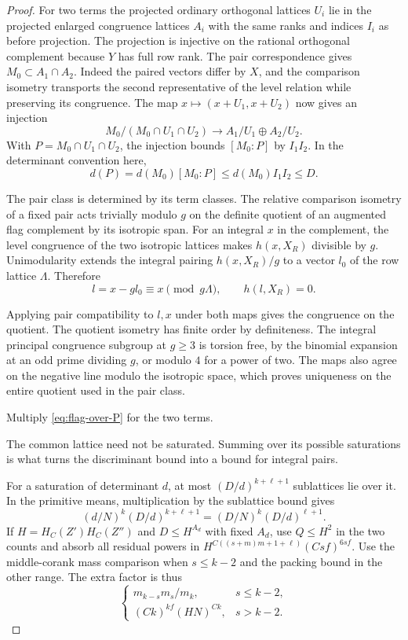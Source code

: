 \begin{proof}

For two terms the projected ordinary orthogonal lattices
\(U_i\) lie in the projected enlarged congruence lattices
\(A_i\) with the same ranks and indices \(I_i\) as before
projection. The projection is injective on the rational
orthogonal complement because \(Y\) has full row rank.
The pair correspondence gives \(M_0\subset A_1\cap A_2\).
Indeed the paired vectors differ by \(X\), and the
comparison isometry transports the second representative
of the level relation while preserving its congruence.
The map \(x\mapsto(x+U_1,x+U_2)\) now gives an injection
\[
 M_0/(M_0\cap U_1\cap U_2)\longrightarrow A_1/U_1\oplus A_2/U_2 .
\]
With \(P=M_0\cap U_1\cap U_2\), the injection bounds
\([M_0:P]\) by \(I_1I_2\). In the determinant convention here,
\[
       d(P)=d(M_0)[M_0:P]\le d(M_0)I_1I_2\le D.
\]


The pair class is determined by its term classes.
The relative comparison isometry of a fixed pair
acts trivially modulo \(g\) on the definite quotient
of an augmented flag complement by its isotropic span.
For an integral \(x\) in the complement,
the level congruence of the two isotropic lattices
makes \(h(x,X_R)\) divisible by \(g\). Unimodularity
extends the integral pairing \(h(x,X_R)/g\) to a vector \(l_0\)
of the row lattice \(\Lambda\). Therefore
\[
       l=x-g l_0\equiv x\pmod{g\Lambda},\qquad h(l,X_R)=0 .
\]

Applying
pair compatibility to \(l,x\) under both maps gives
the congruence on the quotient. The quotient isometry
has finite order by definiteness. The integral
principal congruence subgroup at \(g\geq3\) is
torsion free, by the binomial expansion at an odd
prime dividing \(g\), or modulo \(4\) for a power of
two. The maps also agree on the negative line modulo
the isotropic space, which proves uniqueness on the
entire quotient used in the pair class.

Multiply \eqref{eq:flag-over-P} for the two terms.

The common lattice need not be saturated. Summing over its possible saturations is what turns the discriminant bound into a bound for integral pairs.


For a saturation of determinant \(d\), at most
\((D/d)^{k+\ell+1}\) sublattices lie over it.
In the primitive means, multiplication by the sublattice bound gives
\[
     (d/N)^k(D/d)^{k+\ell+1}=(D/N)^k(D/d)^{\ell+1}.
\]
If
\(H=H_C(Z')H_C(Z'')\) and \(D\leq H^{A_d}\)
with fixed \(A_d\), use \(Q\leq H^2\) in the two
counts and absorb all residual powers in
\(H^{C((s+m)m+1+\ell)}(Csf)^{6sf}\).
Use the middle-corank mass comparison when \(s\le k-2\) and
the packing bound in the other range. The extra factor is thus
\[
   \begin{cases}
     m_{k-s}m_s/m_k,&s\le k-2,\\
     (Ck)^{kf}(HN)^{Ck},&s>k-2.
   \end{cases}
\]


\end{proof}
